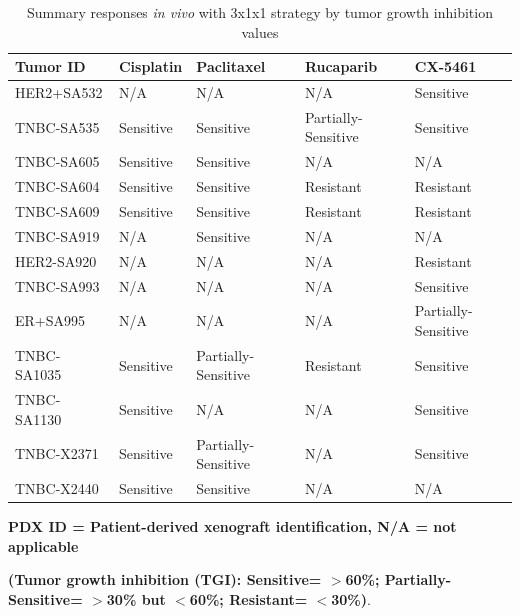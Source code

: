 \begin{table}[htbp]
  \centering
  \caption{Summary responses \textit{in vivo} with 3x1x1 strategy by tumor growth inhibition values}
    \begin{tabular}{|l|l|l|l|l|}
    
     \hline
    \textbf{Tumor ID} & \textbf{Cisplatin} & \textbf{Paclitaxel} & \textbf{Rucaparib} & \textbf{CX-5461} \\
     \hline
    HER2+SA532 & N/A   & N/A   & N/A   & Sensitive \\
    TNBC-SA535 & Sensitive & Sensitive & Partially-Sensitive & Sensitive \\
    TNBC-SA605 & Sensitive & Sensitive & N/A   & N/A \\
    TNBC-SA604 & Sensitive & Sensitive & Resistant & Resistant \\
    TNBC-SA609 & Sensitive & Sensitive & Resistant & Resistant \\
    TNBC-SA919 & N/A   & Sensitive & N/A   & N/A \\
    HER2-SA920 & N/A   & N/A   & N/A   & Resistant \\
    TNBC-SA993 & N/A   & N/A   & N/A   & Sensitive \\
    ER+SA995 & N/A   & N/A   & N/A   & Partially-Sensitive \\
    TNBC-SA1035 & Sensitive & Partially-Sensitive & Resistant & Sensitive \\
    TNBC-SA1130 & Sensitive & N/A   & N/A   & Sensitive \\
    TNBC-X2371 & Sensitive & Partially-Sensitive & N/A   & Sensitive \\
    TNBC-X2440 & Sensitive & Sensitive & N/A   & N/A \\
     \hline
    \end{tabular}%

\small\textbf{PDX ID = Patient-derived xenograft identification, N/A = not applicable}\\
  \label{tab:PDXtumorsinvivo}%


   \small\textbf{ (Tumor growth inhibition (TGI): Sensitive= $>$60\%; Partially-Sensitive= $>$30\% but $<$60\%; Resistant= $<$30\%)}.
\end{table}%





